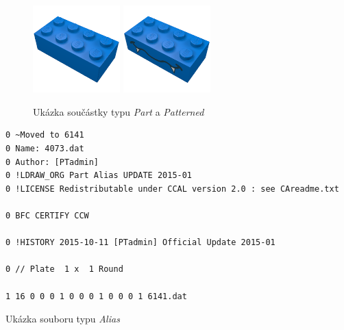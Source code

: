     \begin{figure}[htbp]
        \centering
        \includegraphics[width=0.3\textwidth,height=\textheight,keepaspectratio]{images/3001.png}
        \includegraphics[width=0.3\textwidth,height=\textheight,keepaspectratio]{images/3001p0b.png}
        \caption{Ukázka součástky typu \textit{Part} a \textit{Patterned} \autocite{rebrickable:part:image:3001}\autocite{rebrickable:part:image:3001p0b}\label{obrazek-ldraw-patterned}}
    \end{figure}

      \begin{listing}[htbp]
        \begin{verbatim}
0 ~Moved to 6141
0 Name: 4073.dat
0 Author: [PTadmin]
0 !LDRAW_ORG Part Alias UPDATE 2015-01
0 !LICENSE Redistributable under CCAL version 2.0 : see CAreadme.txt

0 BFC CERTIFY CCW

0 !HISTORY 2015-10-11 [PTadmin] Official Update 2015-01

0 // Plate  1 x  1 Round

1 16 0 0 0 1 0 0 0 1 0 0 0 1 6141.dat
        \end{verbatim}
        \caption{Ukázka souboru typu \textit{Alias} \autocite{ldraw:model:alias}\label{ukazka-alias}}
    \end{listing}

